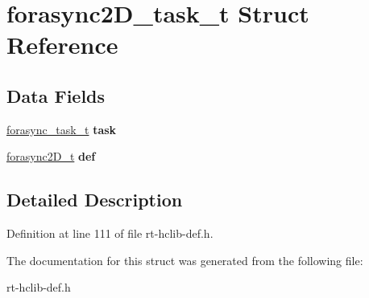 \hypertarget{structforasync2D__task__t}{\section{forasync2\-D\-\_\-task\-\_\-t Struct Reference}
\label{structforasync2D__task__t}
}
\subsection*{Data Fields}
\begin{DoxyCompactItemize}
\item 
\hypertarget{structforasync2D__task__t_aee8f1e7196e560d51d55c436e18da885}{\hyperlink{structforasync__task__t}{forasync\-\_\-task\-\_\-t} {\bfseries task}}\label{structforasync2D__task__t_aee8f1e7196e560d51d55c436e18da885}

\item 
\hypertarget{structforasync2D__task__t_a6e43c3704ece236373586dc8105e6f2b}{\hyperlink{structforasync2D__t}{forasync2\-D\-\_\-t} {\bfseries def}}\label{structforasync2D__task__t_a6e43c3704ece236373586dc8105e6f2b}

\end{DoxyCompactItemize}


\subsection{Detailed Description}


Definition at line 111 of file rt-\/hclib-\/def.\-h.



The documentation for this struct was generated from the following file\-:\begin{DoxyCompactItemize}
\item 
rt-\/hclib-\/def.\-h\end{DoxyCompactItemize}
